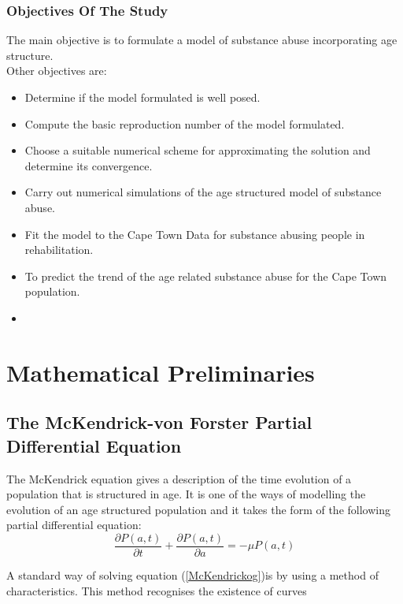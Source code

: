 \subsubsection{Objectives Of The Study} 
The main objective is to formulate a model of substance abuse incorporating age structure.
\\
Other objectives are:

\begin{itemize}
\item Determine if the model formulated is well posed.\\
\item Compute the basic reproduction number of the model formulated.\\
\item Choose a suitable numerical scheme for approximating the solution and determine its convergence.\\
\item Carry out numerical simulations of the age structured model of substance abuse.\\
\item Fit the model to the Cape Town Data for substance abusing people in rehabilitation.\\
\item To predict the trend of the age related substance abuse for the Cape Town population.\\
\item 
\end{itemize}

 
\section{Mathematical Preliminaries}
\subsection{The McKendrick-von Forster Partial Differential Equation}
The McKendrick equation gives a description of the time evolution of a population that is structured in age. It is one of the ways of modelling the evolution of an age structured population and it takes the form of the following partial differential equation:
\begin{equation}\label{McKendrickog}
\frac{\partial P(a,t)}{\partial t}+ \frac{\partial P(a,t)}{\partial a} = -\mu P(a,t)
\end{equation}

A standard way of solving equation (\ref{McKendrickog})is by using a method of characteristics. This method recognises the existence of curves 
